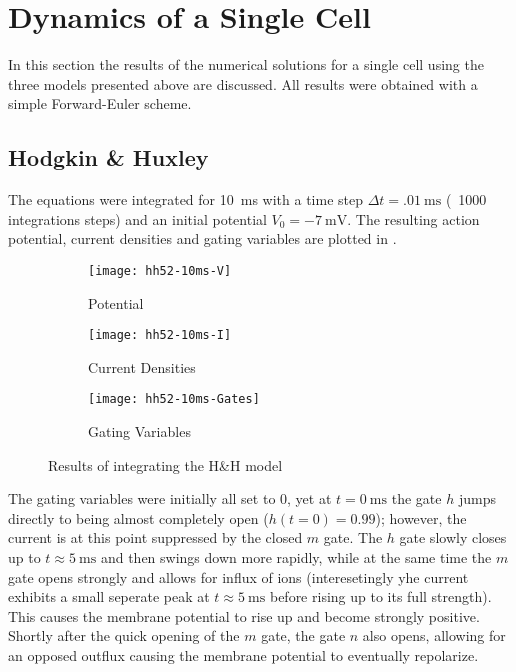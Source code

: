 \section{Dynamics of a Single Cell}
In this section the results of the numerical solutions for a single cell
using the three models presented above are discussed. All results were
obtained with a simple Forward-Euler scheme.

\subsection{Hodgkin \& Huxley}
The equations were integrated for \SI{10}{\milli\second} with a time step
$\Delta{t}=\SI{.01}{\milli\second}$ (\ie~1000 integrations steps) and an
initial potential $V_0=\SI{-7}{\milli\volt}$. The resulting action potential,
current densities and gating variables are plotted in .

\begin{figure}[h]
    \centering
    \begin{subfigure}[h]{.3\textwidth}
        \texttt{[image: hh52-10ms-V]}
        \label{fig:hh1V}
        \caption{Potential}
    \end{subfigure}
    \begin{subfigure}[h]{.3\textwidth}
        \texttt{[image: hh52-10ms-I]}
        \label{fig:hh1I}
        \caption{Current Densities}
    \end{subfigure}
    \begin{subfigure}[h]{.3\textwidth}
        \texttt{[image: hh52-10ms-Gates]}
        \label{fig:hh1Gates}
        \caption{Gating Variables}
    \end{subfigure}
    \label{fig:hh1}
    \caption{Results of integrating the H\&H model}
\end{figure}

The gating variables were initially all set to 0, yet at
$t=\SI{0}{\milli\second}$ the  gate $h$ jumps directly to being almost
completely open ($h(t=0)=0.99$); however, the  current is at this point
suppressed by the closed $m$ gate. The $h$ gate slowly closes up to
$t\approx\SI{5}{\milli\second}$ and then swings down more rapidly, while at the same
time the $m$ gate opens strongly and allows for influx of  ions
(interesetingly yhe  current exhibits a small seperate peak at
$t\approx\SI{5}{\milli\second}$ before rising up to its full strength). This
causes the membrane potential to rise up and become strongly positive. Shortly
after the quick opening of the $m$ gate, the  gate $n$ also opens,
allowing for an opposed  outflux causing the membrane potential to
eventually repolarize.

